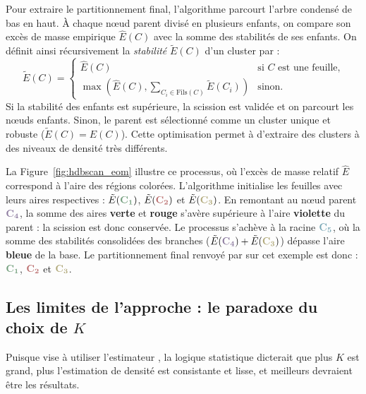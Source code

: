 Pour extraire le partitionnement final, l'algorithme parcourt l'arbre condensé de bas en haut. À chaque nœud parent divisé en plusieurs enfants, on compare son excès de masse empirique $\widehat{E}(C)$ avec la somme des stabilités de ses enfants. On définit ainsi récursivement la \emph{stabilité} $\tilde{E}(C)$ d'un cluster par :
\[
    \tilde{E}(C) = \begin{cases}
        \widehat{E}(C) & \text{si } C \text{ est une feuille,} \\
        \max \left( \widehat{E}(C), \displaystyle\sum_{C_i \in \text{Fils}(C)} \tilde{E}(C_i) \right) & \text{sinon.}
    \end{cases}
\]
Si la stabilité des enfants est supérieure, la scission est validée et on parcourt les n\oe uds enfants. Sinon, le parent est sélectionné comme un cluster unique et robuste ($\tilde{E}(C) = \widehat{E}(C)$). Cette optimisation permet à \HDBSCAN d'extraire des clusters à des niveaux de densité très différents.

La Figure~\ref{fig:hdbscan_eom} illustre ce processus, où l'excès de masse relatif $\widehat{E}$ correspond à l'aire des régions colorées. L'algorithme initialise les feuilles avec leurs aires respectives : $\tilde{E}(\textcolor{c1!80!black}{\mathbf{C_1}})$, $\tilde{E}(\textcolor{c2!80!black}{\mathbf{C_2}})$ et $\tilde{E}(\textcolor{c3!80!black}{\mathbf{C_3}})$. En remontant au nœud parent $\textcolor{c4!80!black}{\mathbf{C_4}}$, la somme des aires \textbf{\textcolor{c1!80!black}{verte}} et \textbf{\textcolor{c2!80!black}{rouge}} s'avère supérieure à l'aire \textbf{\textcolor{c4!80!black}{violette}} du parent : la scission est donc conservée. Le processus s'achève à la racine $\textcolor{c5!80!black}{\mathbf{C_5}}$, où la somme des stabilités consolidées des branches ($\tilde{E}(\textcolor{c4!80!black}{\mathbf{C_4}}) + \tilde{E}(\textcolor{c3!80!black}{\mathbf{C_3}})$) dépasse l'aire \textbf{\textcolor{c5!80!black}{bleue}} de la base. Le partitionnement final renvoyé par \HDBSCAN sur cet exemple est donc : $\textcolor{c1!80!black}{\mathbf{C_1}}$, $\textcolor{c2!80!black}{\mathbf{C_2}}$ et $\textcolor{c3!80!black}{\mathbf{C_3}}$.



\subsection{Les limites de l'approche : le paradoxe du choix de $K$}

Puisque \HDBSCAN vise à utiliser l'estimateur \KNN, la logique statistique dicterait que plus $K$ est grand, plus l'estimation de densité est consistante et lisse, et meilleurs devraient être les résultats. 

